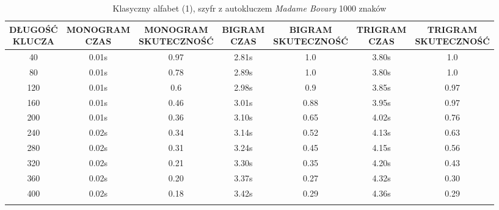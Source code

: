 \documentclass[a4paper]{article}
\theoremstyle{defn}
\theoremstyle{theorem}
\theoremstyle{lemma}
\theoremstyle{cor}
\theoremstyle{fact}
\begin{document}
\begin{center}\begin{small}\begin{longtable}{|c|c|c|c|c|c|c|}
\hline \makecell{DŁUGOŚĆ\\KLUCZA} &  \makecell{MONOGRAM\\CZAS} & \makecell{MONOGRAM\\SKUTECZNOŚĆ} & \makecell{BIGRAM\\CZAS} &  \makecell{BIGRAM\\SKUTECZNOŚĆ} & \makecell{TRIGRAM\\CZAS} & \makecell{TRIGRAM\\SKUTECZNOŚĆ}\\ \hline
40 & 0.01s & 0.97 & 2.81s & 1.0 & 3.80s & 1.0 \\ \hline
80 & 0.01s & 0.78 & 2.89s & 1.0 & 3.80s & 1.0 \\ \hline
120 & 0.01s & 0.6 & 2.98s & 0.9 & 3.85s & 0.97 \\ \hline
160 & 0.01s & 0.46 & 3.01s & 0.88 & 3.95s & 0.97 \\ \hline
200 & 0.01s & 0.36 & 3.10s & 0.65 & 4.02s & 0.76 \\ \hline
240 & 0.02s & 0.34 & 3.14s & 0.52 & 4.13s & 0.63 \\ \hline
280 & 0.02s & 0.31 & 3.24s & 0.45 & 4.15s & 0.56 \\ \hline
320 & 0.02s & 0.21 & 3.30s & 0.35 & 4.20s & 0.43 \\ \hline
360 & 0.02s & 0.20 & 3.37s & 0.27 & 4.32s & 0.30 \\ \hline
400 & 0.02s & 0.18 & 3.42s & 0.29 & 4.36s & 0.29 \\ \hline
\caption{Klasyczny alfabet (1), szyfr z autokluczem \textit{Madame Bovary} 1000 znaków}
\end{longtable}\end{small}\end{center}
\end{document}
